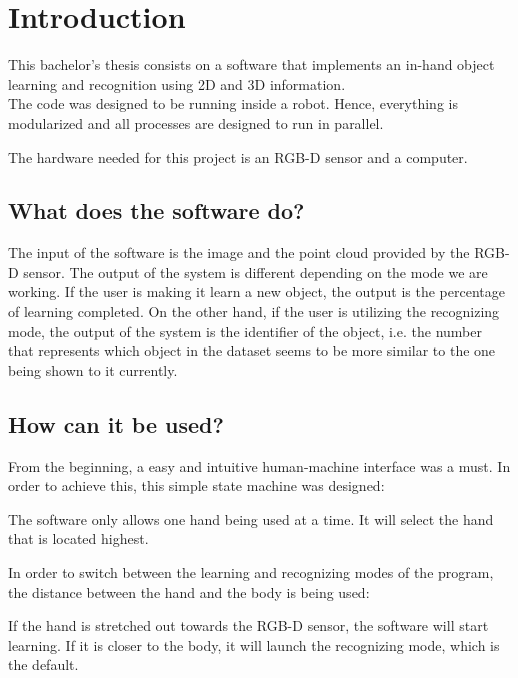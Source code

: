 \chapter*{Introduction}


This bachelor's thesis consists on a software that implements an in-hand object learning and recognition using 2D and 3D information. 
\\

The code was designed to be running inside a robot. Hence, everything is modularized and all processes are designed to run in parallel. 

The hardware needed for this project is an RGB-D sensor and a computer. 

\section*{What does the software do?}
The input of the software is the image and the point cloud provided by the RGB-D sensor. The output of the system is different depending on the mode we are working. If the user is making it learn a new object, the output is the percentage of learning completed. On the other hand, if the user is utilizing the recognizing mode, the output of the system is the identifier of the object, i.e. the number that represents which object in the dataset seems to be more similar to the one being shown to it currently. 


\section*{How can it be used?}
From the beginning, a easy and intuitive human-machine interface was a must. In order to achieve this, this simple state 
machine was designed:


The software only allows one hand being used at a time. It will select the hand that is located highest. 

In order to switch between the learning and recognizing modes of the program, the distance between the hand and the body
is being used: 

If the hand is stretched out towards the RGB-D sensor, the software will start learning. If it is closer to the body, 
it will launch the recognizing mode, which is the default. 


